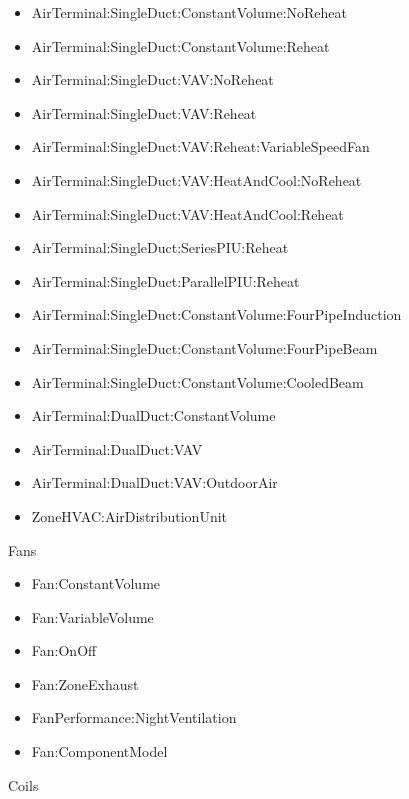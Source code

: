 \begin{itemize}
\tightlist
\item
  AirTerminal:SingleDuct:ConstantVolume:NoReheat
\item
  AirTerminal:SingleDuct:ConstantVolume:Reheat
\item
  AirTerminal:SingleDuct:VAV:NoReheat
\item
  AirTerminal:SingleDuct:VAV:Reheat
\item
  AirTerminal:SingleDuct:VAV:Reheat:VariableSpeedFan
\item
  AirTerminal:SingleDuct:VAV:HeatAndCool:NoReheat
\item
  AirTerminal:SingleDuct:VAV:HeatAndCool:Reheat
\item
  AirTerminal:SingleDuct:SeriesPIU:Reheat
\item
  AirTerminal:SingleDuct:ParallelPIU:Reheat
\item
  AirTerminal:SingleDuct:ConstantVolume:FourPipeInduction
\item
  AirTerminal:SingleDuct:ConstantVolume:FourPipeBeam
\item
  AirTerminal:SingleDuct:ConstantVolume:CooledBeam
\item
  AirTerminal:DualDuct:ConstantVolume
\item
  AirTerminal:DualDuct:VAV
\item
  AirTerminal:DualDuct:VAV:OutdoorAir
\item
  ZoneHVAC:AirDistributionUnit
\end{itemize}

Fans

\begin{itemize}
\tightlist
\item
  Fan:ConstantVolume
\item
  Fan:VariableVolume
\item
  Fan:OnOff
\item
  Fan:ZoneExhaust
\item
  FanPerformance:NightVentilation
\item
  Fan:ComponentModel
\end{itemize}

Coils

